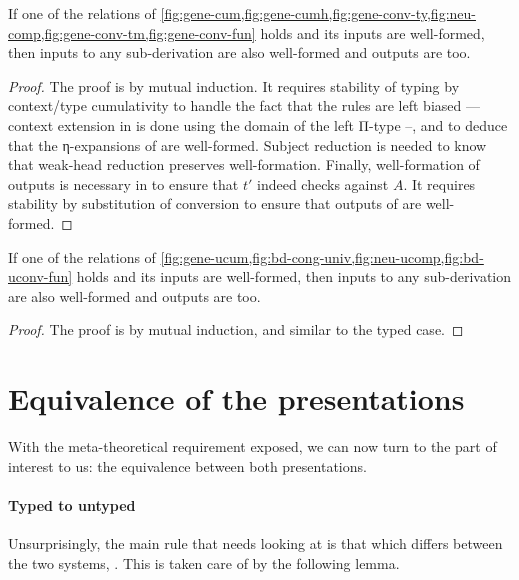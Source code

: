 \begin{minipage}{\textwidth}
\begin{proposition}
  If one of the relations of \cref{fig:gene-cum,fig:gene-cumh,fig:gene-conv-ty,fig:neu-comp,fig:gene-conv-tm,fig:gene-conv-fun}
  holds and its inputs are well-formed, then inputs to any sub-derivation are also well-formed
  and outputs are too.
\end{proposition}
\end{minipage}

\begin{proof}
  The proof is by mutual induction. It requires stability of typing by context/type cumulativity to handle the fact that the
  rules are left biased — \eg context extension in  is done using the domain of the left Π-type –,
  and to deduce that the η-expansions of  are well-formed.
  Subject reduction is needed to know that weak-head reduction preserves well-formation.
  Finally, well-formation of outputs is necessary in 
  to ensure that $t'$ indeed checks against $A$. It requires stability by substitution of conversion
  to ensure that outputs of  are well-formed.
\end{proof}

\begin{proposition}
  If one of the relations of \cref{fig:gene-ucum,fig:bd-cong-univ,fig:neu-ucomp,fig:bd-uconv-fun}
  holds and its inputs are well-formed, then inputs to any sub-derivation are also well-formed
  and outputs are too.
\end{proposition}

\begin{proof}
  The proof is by mutual induction, and similar to the typed case.
\end{proof}

\section{Equivalence of the presentations}
\label{sec:unty-conv-equiv}

With the meta-theoretical requirement exposed, we can now turn to the part of interest to us: the equivalence between both
presentations.

\paragraph{Typed to untyped}
Unsurprisingly, the main rule that needs looking at is that which differs between the two systems,
\ie {}.
This is taken care of by the following lemma.

